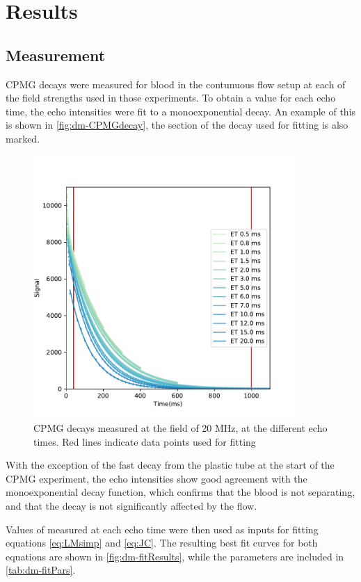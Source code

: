 \section{Results}

\subsection{\Ttwo Measurement}
CPMG decays were measured for blood in the contunuous flow setup at each of the field strengths used in those experiments.
To obtain a \Ttwo value for each echo time, the echo intensities were fit to a monoexponential decay.
An example of this is shown in \autoref{fig:dm-CPMGdecay}, the section of the decay used for fitting is also marked.

\begin{figure}[h]
\centering
\includegraphics[width=10cm]{figures/diffmodels/20MHzT2fit.pdf}

\caption{CPMG decays measured at the field of 20 MHz, at the different echo times. Red lines indicate data points used for fitting}
\label{fig:dm-CPMGdecay}
\end{figure}

With the exception of the fast decay from the plastic tube at the start of the CPMG experiment, the echo intensities show good agreement with the monoexponential decay function, which confirms that the blood is not separating, and that the decay is not significantly affected by the flow.

Values of \Ttwo measured at each echo time were then used as inputs for fitting equations \ref{eq:LMsimp} and \ref{eq:JC}.
The resulting best fit curves for both equations are shown in \autoref{fig:dm-fitResults}, while the parameters are included in \autoref{tab:dm-fitPars}.



